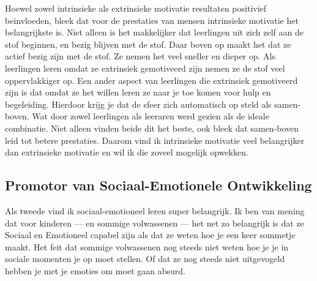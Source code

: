             \noindent Hoewel zowel intrinsieke als extrinsieke motivatie resultaten positivief beinvloeden, bleek dat voor de prestaties van mensen intrinsieke motivatie het belangrijkste is.\cite{intrinsic-motivation-is-more-important} Niet alleen is het makkelijker dat leerlingen uit zich zelf aan de stof beginnen, en bezig blijven met de stof. Daar boven op maakt het dat ze actief bezig zijn met de stof. Ze nemen het veel sneller en dieper op. Als leerlingen leren omdat ze extrinsiek gemotiveerd zijn nemen ze de stof veel oppervlakkiger op\cite{extrinsic-motivation-results-in-supperfical-learning}. Een ander aspect van leerlingen die extrinsiek gemotiveerd zijn is dat omdat ze het willen leren ze naar je toe komen voor hulp en begeleiding. Hierdoor krijg je dat de sfeer zich automatisch op steld als samen-boven. Wat door zowel leerlingen als leeraren werd gezien als de ideale combinatie. Niet alleen vinden beide dit het beste, ook bleek dat samen-boven leid tot betere prestaties.\cite{samen-boven-leads-to-better-results} Daarom vind ik intrinsieke motivatie veel belangrijker dan extrinsieke motivatie en wil ik die zoveel mogelijk opwekken. 
            
            
        \subsection{Promotor van Sociaal-Emotionele Ontwikkeling}
            Als tweede vind ik sociaal-emotioneel leren super belangrijk. Ik ben van mening dat voor kinderen — en sommige volwassenen — het net zo belangrijk is dat ze Sociaal en Emotioneel capabel zijn als dat ze weten hoe je een keer sommetje maakt. Het feit dat sommige volwassenen nog steeds niet weten hoe je je in sociale momenten je op moet stellen. Of dat ze nog steeds niet uitgevogeld hebben je met je emoties om moet gaan absurd.

            \bigskip
        
